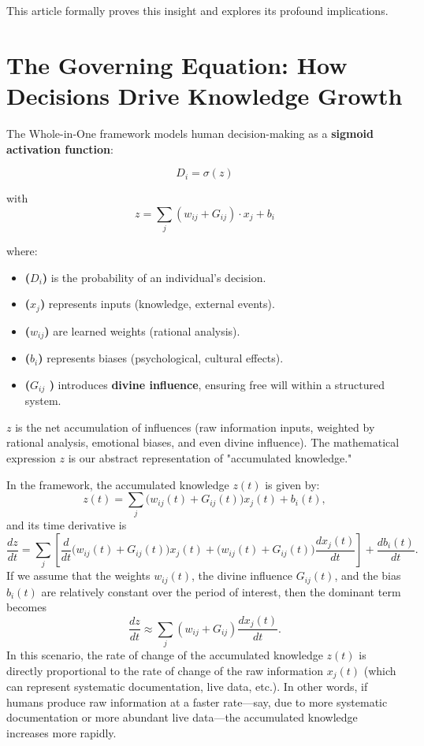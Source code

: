 \documentclass{article}
\newcommand{\bn}{\bigskip\noindent}
\begin{document}
This article formally proves this insight and explores its profound implications.  



\section{The Governing Equation: How Decisions Drive Knowledge Growth}

The Whole-in-One framework models human decision-making as a {\bf sigmoid activation function}:  

$$
D_i = \sigma \left(z \right)
$$

with   $$z = \sum_{j} (w_{ij} + G_{ij}) \cdot x_j + b_i$$

where:  

\begin{itemize}
\item  {\bf ($D_i$)} is the probability of an individual's decision.  
\item {\bf ($x_j$)} represents inputs (knowledge, external events).  
\item  {\bf ($w_{ij}$)} are learned weights (rational analysis).  
\item {\bf ($b_i$)} represents biases (psychological, cultural effects).  
\item {\bf ($G_{ij}$ )} introduces {\bf divine influence}, ensuring free will within a structured system.  
\end{itemize}

$z$ is the net accumulation of influences (raw information inputs, weighted by rational analysis, emotional biases, and even divine influence). The mathematical expression $z$ is our abstract representation of "accumulated knowledge." 

\bn
 In the framework, the accumulated knowledge $z(t)$ is given by:
$$z(t) = \sum_{j} \bigl(w_{ij}(t) + G_{ij}(t)\bigr)x_j(t) + b_i(t),
$$
and its time derivative is
$$
\frac{dz}{dt} = \sum_{j} \left[\frac{d}{dt}\bigl(w_{ij}(t)+G_{ij}(t)\bigr)x_j(t) + \bigl(w_{ij}(t)+G_{ij}(t)\bigr)\frac{dx_j(t)}{dt}\right] + \frac{db_i(t)}{dt}.
$$
If we assume that the weights $w_{ij}(t)$, the divine influence $G_{ij}(t)$, and the bias $b_i(t)$ are relatively constant over the period of interest, then the dominant term becomes
$$
\frac{dz}{dt} \approx \sum_{j} \left(w_{ij}+G_{ij}\right)\frac{dx_j(t)}{dt}.
$$
In this scenario, the rate of change of the accumulated knowledge $z(t)$ is directly proportional to the rate of change of the raw information $x_j(t)$ (which can represent systematic documentation, live data, etc.). In other words, if humans produce raw information at a faster rate---say, due to more systematic documentation or more abundant live data---the accumulated knowledge increases more rapidly.
\end{document}
